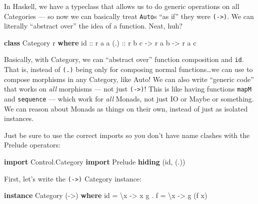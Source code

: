 \documentclass[]{article}
\newenvironment{Shaded}{}{}
\newcommand{\KeywordTok}[1]{\textcolor[rgb]{0.00,0.44,0.13}{\textbf{{#1}}}}
\newcommand{\DataTypeTok}[1]{\textcolor[rgb]{0.56,0.13,0.00}{{#1}}}
\newcommand{\OtherTok}[1]{\textcolor[rgb]{0.00,0.44,0.13}{{#1}}}
\newcommand{\FunctionTok}[1]{\textcolor[rgb]{0.02,0.16,0.49}{{#1}}}
\newcommand{\NormalTok}[1]{{#1}}
\begin{document}
In Haskell, we have a typeclass that allows us to do generic operations on all
Categories --- so now we can basically treat \texttt{Auto}s ``as if'' they were
\texttt{(-\textgreater{})}. We can literally ``abstract over'' the idea of a
function. Neat, huh?

\begin{Shaded}
\begin{Highlighting}[]
\KeywordTok{class} \DataTypeTok{Category} \NormalTok{r }\KeywordTok{where}
\OtherTok{    id  ::} \NormalTok{r a a}
\OtherTok{    (.) ::} \NormalTok{r b c }\OtherTok{->} \NormalTok{r a b }\OtherTok{->} \NormalTok{r a c}
\end{Highlighting}
\end{Shaded}

Basically, with Category, we can ``abstract over'' function composition and
\texttt{id}. That is, instead of \texttt{(.)} being only for composing normal
functions\ldots{}we can use to compose morphisms in any Category, like Auto! We
can also write ``generic code'' that works on \emph{all} morphisms --- not just
\texttt{(-\textgreater{})}! This is like having functions \texttt{mapM} and
\texttt{sequence} --- which work for \emph{all} Monads, not just IO or Maybe or
something. We can reason about Monads as things on their own, instead of just as
isolated instances.

Just be sure to use the correct imports so you don't have name clashes with the
Prelude operators:

\begin{Shaded}
\begin{Highlighting}[]
\KeywordTok{import }\DataTypeTok{Control.Category}
\KeywordTok{import }\DataTypeTok{Prelude} \KeywordTok{hiding} \NormalTok{(id, (.))}
\end{Highlighting}
\end{Shaded}

First, let's write the \texttt{(-\textgreater{})} Category instance:

\begin{Shaded}
\begin{Highlighting}[]
\KeywordTok{instance} \DataTypeTok{Category} \NormalTok{(}\OtherTok{->}\NormalTok{) }\KeywordTok{where}
    \NormalTok{id    }\FunctionTok{=} \NormalTok{\textbackslash{}x }\OtherTok{->} \NormalTok{x}
    \NormalTok{g }\FunctionTok{.} \NormalTok{f }\FunctionTok{=} \NormalTok{\textbackslash{}x }\OtherTok{->} \NormalTok{g (f x)}
\end{Highlighting}
\end{Shaded}
\end{document}
